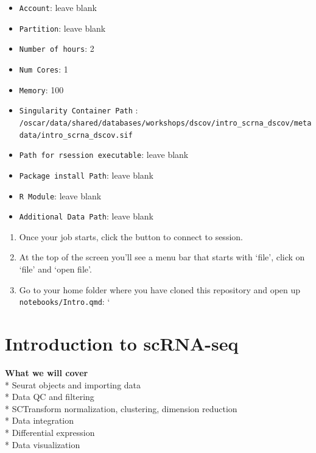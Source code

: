 \documentclass[
  letterpaper,
  DIV=11,
  numbers=noendperiod]{scrreprt}
\providecommand{\tightlist}{%
  \setlength{\itemsep}{0pt}\setlength{\parskip}{0pt}}
\begin{document}
\begin{itemize}
\tightlist
\item
  \texttt{Account}: leave blank\\
\item
  \texttt{Partition}: leave blank\\
\item
  \texttt{Number\ of\ hours}: 2\\
\item
  \texttt{Num\ Cores}: 1\\
\item
  \texttt{Memory}: 100\\
\item
  \texttt{Singularity\ Container\ Path} :
  \texttt{/oscar/data/shared/databases/workshops/dscov/intro\_scrna\_dscov/metadata/intro\_scrna\_dscov.sif}\\
\item
  \texttt{Path\ for\ rsession\ executable}: leave blank\\
\item
  \texttt{Package\ install\ Path}: leave blank\\
\item
  \texttt{R\ Module}: leave blank\\
\item
  \texttt{Additional\ Data\ Path}: leave blank\\
\end{itemize}

\begin{enumerate}
\def\labelenumi{\arabic{enumi}.}
\setcounter{enumi}{4}
\tightlist
\item
  Once your job starts, click the button to connect to session.\\
\item
  At the top of the screen you'll see a menu bar that starts with
  `file', click on `file' and `open file'.\\
\item
  Go to your home folder where you have cloned this repository and open
  up \texttt{notebooks/Intro.qmd}: `
\end{enumerate}

\section{Introduction to scRNA-seq}\label{introduction-to-scrna-seq}

\textbf{What we will cover}\\
* Seurat objects and importing data\\
* Data QC and filtering\\
* SCTransform normalization, clustering, dimension reduction\\
* Data integration\\
* Differential expression\\
* Data visualization\\
\end{document}
